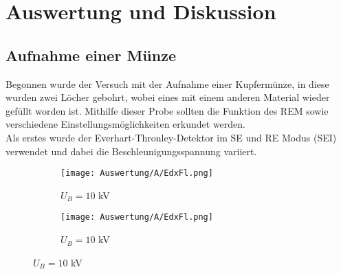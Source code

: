 
\chapter{Auswertung und Diskussion}
\label{chap:versuchsauswertung}

\section{Aufnahme einer Münze}
Begonnen wurde der Versuch mit der Aufnahme einer Kupfermünze, in diese wurden zwei Löcher gebohrt, wobei eines mit einem anderen Material wieder gefüllt worden ist. Mithilfe dieser Probe sollten die Funktion des REM sowie verschiedene Einstellungsmöglichkeiten erkundet werden.\\

Als erstes wurde der Everhart-Thronley-Detektor im SE und RE Modus (SEI) verwendet und dabei die Beschleunigungsspannung variiert.
\begin{figure}[h]
    \centering
    
    \begin{subfigure}[b]{0.25\textwidth}
        \centering
        \texttt{[image: Auswertung/A/EdxFl.png]}
        \caption{$U_B = 10$ kV}
    \end{subfigure}
    \hfill
    \begin{subfigure}[b]{0.25\textwidth}
        \centering
        \texttt{[image: Auswertung/A/EdxFl.png]}
        \caption{$U_B = 10$ kV}
    \end{subfigure}
\end{figure}